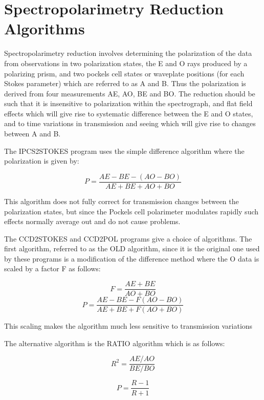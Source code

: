 \documentclass[11pt,twoside]{article}
\renewcommand{\_}{\texttt{\symbol{95}}}
\begin{document}
\section{Spectropolarimetry Reduction Algorithms}

Spectropolarimetry reduction involves determining the polarization of the
data from observations in two polarization states, the E and O rays produced by
a polarizing prism, and two pockels cell states or waveplate positions
(for each Stokes parameter) which are referred to as A and B. Thus the
polarization is derived from four measurements AE, AO, BE and BO. The reduction
should be such that it is insensitive to polarization within the spectrograph,
and flat field effects which will give rise to systematic difference between
the E and O states, and to time variations in transmission and seeing which
will give rise to changes between A and B.

The IPCS2STOKES program uses the simple difference algorithm where the
polarization is given by:

\begin{equation}
P = \frac{AE-BE-(AO-BO)}{AE+BE+AO+BO}
\end{equation}

This algorithm does not fully correct for transmission changes between the
polarization states, but since the Pockels cell polarimeter modulates rapidly
such effects normally average out and do not cause problems.

The CCD2STOKES and CCD2POL programs give a choice of algorithms. The first
algorithm, referred to as the OLD algorithm, since it is the original one used
by these programs is a modification of the difference method where the O data
is scaled by a factor F as follows:

\begin{equation}
F = \frac{AE+BE}{AO+BO}
\end{equation}
\begin{equation}
P = \frac{AE-BE-F(AO-BO)}{AE+BE+F(AO+BO)}
\end{equation}

This scaling makes the algorithm much less sensitive to transmission variations

The alternative algorithm is the RATIO algorithm which is as follows:

\begin{equation}
R^2 = \frac{AE/AO}{BE/BO}
\end{equation}

\begin{equation}
P = \frac{R-1}{R+1}
\end{equation}
\end{document}
